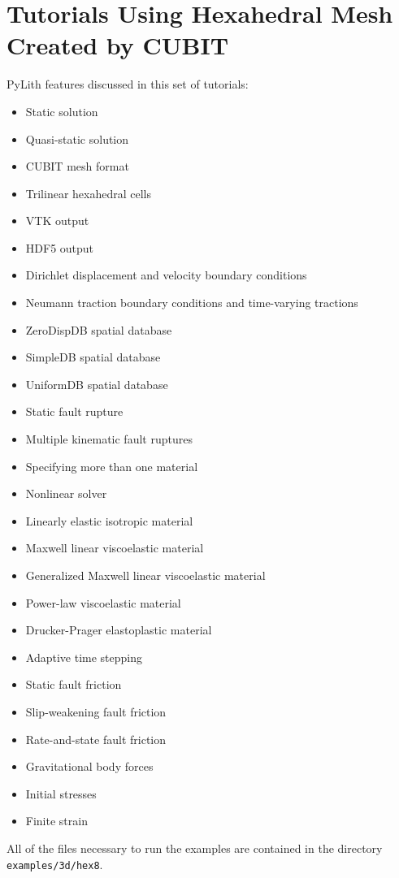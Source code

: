 
\section{\label{sec:Tutorial-3d-hex8}Tutorials Using Hexahedral Mesh Created
by CUBIT}

PyLith features discussed in this set of tutorials:
\begin{itemize}
\item Static solution
\item Quasi-static solution
\item CUBIT mesh format
\item Trilinear hexahedral cells
\item VTK output
\item HDF5 output
\item Dirichlet displacement and velocity boundary conditions
\item Neumann traction boundary conditions and time-varying tractions
\item ZeroDispDB spatial database
\item SimpleDB spatial database
\item UniformDB spatial database
\item Static fault rupture
\item Multiple kinematic fault ruptures
\item Specifying more than one material
\item Nonlinear solver
\item Linearly elastic isotropic material
\item Maxwell linear viscoelastic material
\item Generalized Maxwell linear viscoelastic material
\item Power-law viscoelastic material
\item Drucker-Prager elastoplastic material
\item Adaptive time stepping
\item Static fault friction
\item Slip-weakening fault friction
\item Rate-and-state fault friction
\item Gravitational body forces
\item Initial stresses
\item Finite strain
\end{itemize}
All of the files necessary to run the examples are contained in the
directory \texttt{examples/3d/hex8}.


